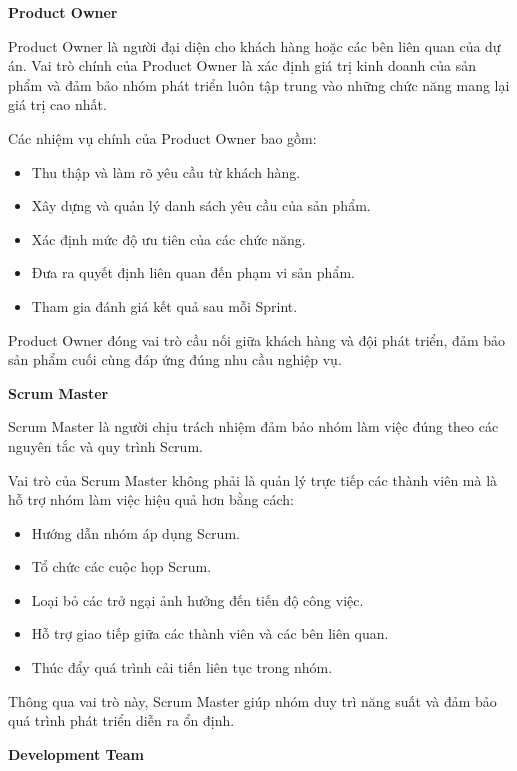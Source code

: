 \textbf{Product Owner}

\hspace{0.2cm}Product Owner là người đại diện cho khách hàng hoặc các bên liên quan của dự án. Vai trò chính của Product Owner là xác định giá trị kinh doanh của sản phẩm và đảm bảo nhóm phát triển luôn tập trung vào những chức năng mang lại giá trị cao nhất.

\hspace{0.2cm}Các nhiệm vụ chính của Product Owner bao gồm:

\begin{itemize}
\item Thu thập và làm rõ yêu cầu từ khách hàng.
\item Xây dựng và quản lý danh sách yêu cầu của sản phẩm.
\item Xác định mức độ ưu tiên của các chức năng.
\item Đưa ra quyết định liên quan đến phạm vi sản phẩm.
\item Tham gia đánh giá kết quả sau mỗi Sprint.
\end{itemize}

Product Owner đóng vai trò cầu nối giữa khách hàng và đội phát triển, đảm bảo sản phẩm cuối cùng đáp ứng đúng nhu cầu nghiệp vụ.


\textbf{Scrum Master}

\hspace{0.2cm}Scrum Master là người chịu trách nhiệm đảm bảo nhóm làm việc đúng theo các nguyên tắc và quy trình Scrum.

\hspace{0.2cm}Vai trò của Scrum Master không phải là quản lý trực tiếp các thành viên mà là hỗ trợ nhóm làm việc hiệu quả hơn bằng cách:

\begin{itemize}
\item Hướng dẫn nhóm áp dụng Scrum.
\item Tổ chức các cuộc họp Scrum.
\item Loại bỏ các trở ngại ảnh hưởng đến tiến độ công việc.
\item Hỗ trợ giao tiếp giữa các thành viên và các bên liên quan.
\item Thúc đẩy quá trình cải tiến liên tục trong nhóm.
\end{itemize}

Thông qua vai trò này, Scrum Master giúp nhóm duy trì năng suất và đảm bảo quá trình phát triển diễn ra ổn định.


\textbf{Development Team}

